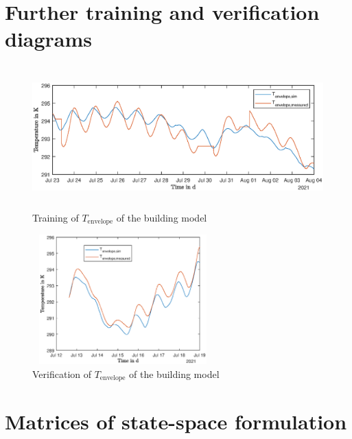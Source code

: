 \section{Further training and verification diagrams}
\label{sec:appendix:TrainingEnvelope}
\begin{figure}[H]
            \centering
            \includegraphics[width=14cm,height=5.5cm]{figure/TrainingEnvelope.eps}
           \caption{Training of $T_\text{envelope}$ of the building model}
           \label{fig:trainingModelenvelope}
    \end{figure}
    \begin{figure}[H]
            \centering
            \includegraphics[width=7cm,height=5cm]{figure/ValidierungEnvelope.eps}
           \caption{Verification of $T_\text{envelope}$ of the building model}
           \label{fig:verificationModelenvelpe}
    \end{figure}
    
\section{Matrices of state-space formulation}
\label{sec:appendix:Matrizen}
    
